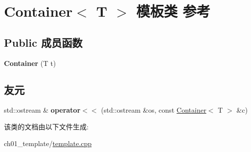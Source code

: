 \hypertarget{class_container}{}\section{Container$<$ T $>$ 模板类 参考}
\label{class_container}
\subsection*{Public 成员函数}
\begin{DoxyCompactItemize}
\item 
\mbox{\label{class_container_ab5b1c221a3bb63fbf9a49caafc5c89eb}} 
{\bfseries Container} (T t)
\end{DoxyCompactItemize}
\subsection*{友元}
\begin{DoxyCompactItemize}
\item 
\mbox{\label{class_container_aebe70e1296e95e26839442e4227c27e0}} 
std\+::ostream \& {\bfseries operator$<$$<$} (std\+::ostream \&os, const \mbox{\hyperlink{class_container}{Container}}$<$ T $>$ \&c)
\end{DoxyCompactItemize}


该类的文档由以下文件生成\+:\begin{DoxyCompactItemize}
\item 
ch01\+\_\+template/\mbox{\hyperlink{template_8cpp}{template.\+cpp}}\end{DoxyCompactItemize}
